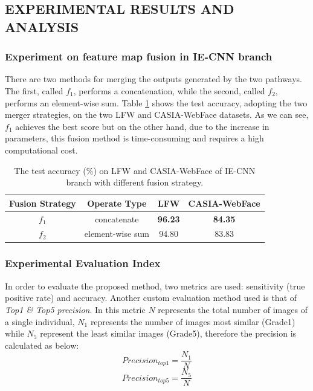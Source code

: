 \subsection{EXPERIMENTAL RESULTS AND ANALYSIS}
\subsubsection{Experiment on feature map fusion in IE-CNN branch}
There are two methods for merging the outputs generated by the two pathways. 
The first, called $f_1$, performs a concatenation, while the second, called 
$f_2$, performs an element-wise sum. Table \ref{testAccuracyIE-CNN} shows the test accuracy, adopting 
the two merger strategies, on the two LFW and CASIA-WebFace datasets. 
As we can see, $f_1$ achieves the best score but on the other hand, due to the 
increase in parameters, this fusion method is time-consuming and requires a 
high computational cost.
\begin{table}[h!]
    \centering
    \begin{adjustbox}{max width=\textwidth}
    \begin{tabular}{|c|c|c|c|}
        \hline
        \bfseries{Fusion Strategy} & \bfseries{Operate Type} & \bfseries{LFW} &\bfseries{CASIA-WebFace}\\
        \hline
        $f_1$ & concatenate & \bfseries{96.23} & \bfseries{84.35}\\
        \hline
        $f_2$ & element-wise sum & 94.80 & 83.83\\
        \hline
    \end{tabular}
    \end{adjustbox}
    \caption{The test accuracy (\%) on LFW and CASIA-WebFace of IE-CNN branch with different fusion strategy.}
    \label{testAccuracyIE-CNN}
\end{table}

\subsubsection{Experimental Evaluation Index}
In order to evaluate the proposed method, two metrics are used: sensitivity 
(true positive rate) and accuracy. Another custom evaluation method used 
is that of \emph{Top1 \& Top5 precision}. In this metric $N$ represents the total 
number of images of a single individual, $N_1$ represents the number of images 
most similar (Grade1) while $N_5$ represent the least similar images (Grade5), 
therefore the precision is calculated as below:
\begin{equation}
    Precision_{top1}= \frac{N_1}{N}
\end{equation}
\begin{equation}
    Precision_{top5}= \frac{N_5}{N}
\end{equation}

